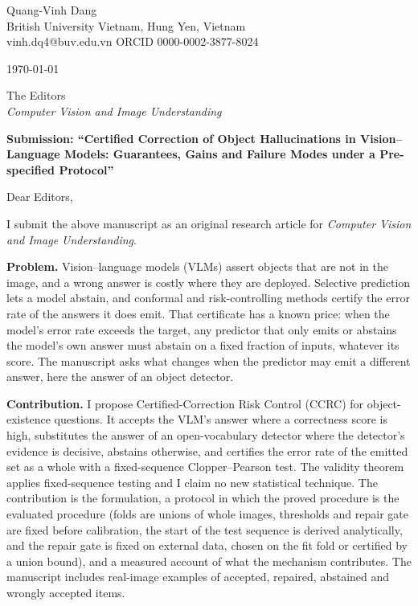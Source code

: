 \documentclass[10.5pt,a4paper]{article}
\begin{document}
Quang-Vinh Dang\\
British University Vietnam, Hung Yen, Vietnam\\
vinh.dq4@buv.edu.vn \quad ORCID 0000-0002-3877-8024

\today

The Editors\\
\emph{Computer Vision and Image Understanding}

\textbf{Submission: ``Certified Correction of Object Hallucinations in Vision--Language Models: Guarantees, Gains and Failure Modes under a Pre-specified Protocol''}

Dear Editors,

I submit the above manuscript as an original research article for \emph{Computer Vision and Image Understanding}.

\textbf{Problem.} Vision--language models (VLMs) assert objects that are not in the image, and a wrong answer is costly where they are deployed. Selective prediction lets a model abstain,
and conformal and risk-controlling methods certify the error rate of the answers it does emit. That certificate has a known price: when the model's error rate exceeds the target, any predictor that only emits
or abstains the model's own answer must abstain on a fixed fraction of inputs, whatever its score. The manuscript asks what changes when the predictor may emit a different answer, here the answer of an object detector.

\textbf{Contribution.} I propose Certified-Correction Risk Control (CCRC) for object-existence questions. It accepts the VLM's answer where a correctness score is high, substitutes the answer of an
open-vocabulary detector where the detector's evidence is decisive, abstains otherwise, and certifies the error rate of the emitted set as a whole with a fixed-sequence Clopper--Pearson test. The validity theorem
applies fixed-sequence testing and I claim no new statistical technique. The contribution is the formulation, a protocol in which the proved procedure is the evaluated procedure (folds are unions of whole images, thresholds and repair gate are fixed
before calibration, the start of the test sequence is derived analytically, and the repair gate is fixed on external data, chosen on the fit fold or certified by a union bound), and a measured account of what the mechanism contributes.
The manuscript includes real-image examples of accepted, repaired, abstained and wrongly accepted items.
\end{document}
